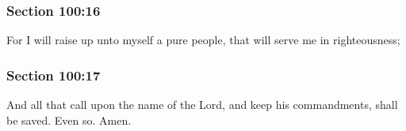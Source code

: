 	\subsubsection{Section 100:16} %
		\label{DC100-16}

		For I will raise up unto myself a pure people, that will serve me in righteousness;


	\subsubsection{Section 100:17} %
		\label{DC100-17}

		And all that call upon the name of the Lord, and keep his commandments, shall be saved.  Even so.  Amen.

